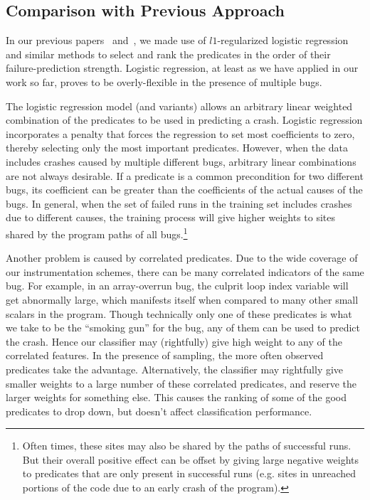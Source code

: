 \subsection{Comparison with Previous Approach}
In our previous papers~\cite{Zheng:2003:SDSP} and~\cite{PLDI`03*141},
we made use of $l1$-regularized logistic regression and similar
methods to select and rank the predicates in the order of their
failure-prediction strength.  Logistic regression, at least as we have
applied in our work so far, proves to be overly-flexible
in the presence of multiple bugs.


The logistic regression model (and variants) allows an arbitrary
linear weighted combination of the predicates to be used in predicting
a crash.  Logistic regression incorporates a penalty that forces the
regression to set most coefficients to zero, thereby selecting only the most
important predicates.  However, when the data includes crashes caused
by multiple different bugs, arbitrary linear
combinations are not always desirable.  If a predicate is a
common precondition for two different bugs, its coefficient
can be greater than the coefficients of the actual causes of the bugs.  
In general, when the set of failed runs in
the training set includes crashes due to different causes, the
training process will give higher weights to sites shared by the
program paths of all bugs.\footnote{Often times, these sites may also be
shared by the paths of successful runs.  But their overall positive
effect can be offset by giving large negative weights to predicates
that are only present in successful runs (e.g. sites in unreached
portions of the code due to an early crash of the program).}

Another problem is caused by correlated predicates.
Due to the wide coverage of our instrumentation schemes, there can be
many correlated indicators of the same bug.  For example, in an
array-overrun bug, the culprit loop index variable will get abnormally
large, which manifests itself when compared to many other small
scalars in the program. Though technically only one of these
predicates is what we take to be the ``smoking gun'' for the bug, any
of them can be used to predict the crash.  Hence our classifier may
(rightfully) give high weight to any of the correlated features.  In
the presence of sampling, the more often observed predicates take the
advantage.  Alternatively, the classifier may rightfully give smaller
weights to a large number of these correlated predicates, and reserve
the larger weights for something else.  This causes the ranking of
some of the good predicates to drop down, but doesn't affect
classification performance.

